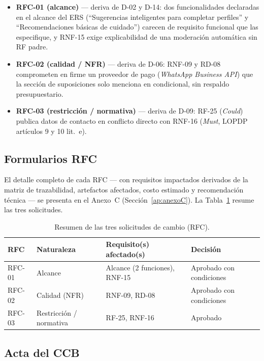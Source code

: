 \documentclass[journal,onecolumn]{IEEEtran}
\begin{document}
	\begin{itemize}
		\item \textbf{RFC-01 (alcance)} --- deriva de D-02 y D-14: dos
		funcionalidades declaradas en el alcance del ERS (``Sugerencias
		inteligentes para completar perfiles'' y ``Recomendaciones
		básicas de cuidado'') carecen de requisito funcional que las
		especifique, y RNF-15 exige explicabilidad de una moderación
		automática sin RF padre.
		\item \textbf{RFC-02 (calidad / NFR)} --- deriva de D-06:
		RNF-09 y RD-08 comprometen en firme un proveedor de pago
		(\emph{WhatsApp Business API}) que la sección de suposiciones
		solo menciona en condicional, sin respaldo presupuestario.
		\item \textbf{RFC-03 (restricción / normativa)} --- deriva de
		D-09: RF-25 (\emph{Could}) publica datos de contacto en
		conflicto directo con RNF-16 (\emph{Must}, LOPDP artículos 9 y
		10 lit.\ e).
	\end{itemize}
	
	\subsection{Formularios RFC}
	
	El detalle completo de cada RFC --- con requisitos impactados
	derivados de la matriz de trazabilidad, artefactos afectados,
	costo estimado y recomendación técnica --- se presenta en el
	Anexo~C (Sección~\ref{ap:anexoC}). La Tabla~\ref{tab:rfc-resumen}
	resume las tres solicitudes.
	
	\begin{table}[H]
		\centering
		\caption{Resumen de las tres solicitudes de cambio (RFC).}
		\label{tab:rfc-resumen}
		\small
		\begin{tabularx}{\textwidth}{@{}l l X l@{}}
			\toprule
			\textbf{RFC} & \textbf{Naturaleza} & \textbf{Requisito(s) afectado(s)} & \textbf{Decisión} \\
			\midrule
			RFC-01 & Alcance & Alcance (2 funciones), RNF-15 & Aprobado con condiciones \\
			RFC-02 & Calidad (NFR) & RNF-09, RD-08 & Aprobado con condiciones \\
			RFC-03 & Restricción / normativa & RF-25, RNF-16 & Aprobado \\
			\bottomrule
		\end{tabularx}
	\end{table}
	
	\subsection{Acta del CCB}
	\label{sec:acta-ccb}
	
\end{document}
